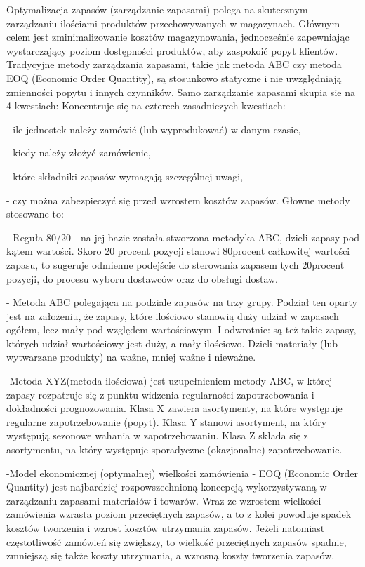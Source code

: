 Optymalizacja zapasów (zarządzanie zapasami) polega na skutecznym zarządzaniu ilościami produktów przechowywanych w magazynach. Głównym celem jest zminimalizowanie kosztów magazynowania, jednocześnie zapewniając wystarczający poziom dostępności produktów, aby zaspokoić popyt klientów. Tradycyjne metody zarządzania zapasami, takie jak metoda ABC czy metoda EOQ (Economic Order Quantity), są stosunkowo statyczne i nie uwzględniają zmienności popytu i innych czynników.
Samo zarządzanie zapasami skupia sie na 4 kwestiach:
Koncentruje się na czterech zasadniczych kwestiach:

   - ile jednostek należy zamówić (lub wyprodukować) w danym czasie,
   
   - kiedy należy złożyć zamówienie,
   
  -  które składniki zapasów wymagają szczególnej uwagi,
  
 -   czy można zabezpieczyć się przed wzrostem kosztów zapasów.
 \vspace{\baselineskip} 
  Głowne metody stosowane to:
  
 - Reguła 80/20 - na jej bazie została stworzona metodyka ABC, dzieli zapasy pod kątem wartości. Skoro 20 procent pozycji stanowi 80procent całkowitej wartości zapasu, to sugeruje odmienne podejście do sterowania zapasem tych 20procent pozycji, do procesu wyboru dostawców oraz do obsługi dostaw.

 - Metoda ABC polegająca na podziale zapasów na trzy grupy. Podział ten oparty jest na założeniu, że zapasy, które ilościowo stanowią duży udział w zapasach ogółem, lecz mały pod względem wartościowym. I odwrotnie: są też takie zapasy, których udział wartościowy jest duży, a mały ilościowo. Dzieli materiały (lub wytwarzane produkty) na ważne, mniej ważne i nieważne. 
 
-Metoda XYZ(metoda ilościowa) jest uzupełnieniem metody ABC, w której zapasy rozpatruje się z punktu widzenia regularności zapotrzebowania i dokładności prognozowania. Klasa X zawiera asortymenty, na które występuje regularne zapotrzebowanie (popyt). Klasa Y stanowi asortyment, na który występują sezonowe wahania w zapotrzebowaniu. Klasa Z składa się z asortymentu, na który występuje sporadyczne (okazjonalne) zapotrzebowanie. 

-Model ekonomicznej (optymalnej) wielkości zamówienia - EOQ (Economic Order Quantity) jest najbardziej rozpowszechnioną koncepcją wykorzystywaną w zarządzaniu zapasami materiałów i towarów. Wraz ze wzrostem wielkości zamówienia wzrasta poziom przeciętnych zapasów, a to z kolei powoduje spadek kosztów tworzenia i wzrost kosztów utrzymania zapasów. Jeżeli natomiast częstotliwość zamówień się zwiększy, to wielkość przeciętnych zapasów spadnie, zmniejszą się także koszty utrzymania, a wzrosną koszty tworzenia zapasów. 


